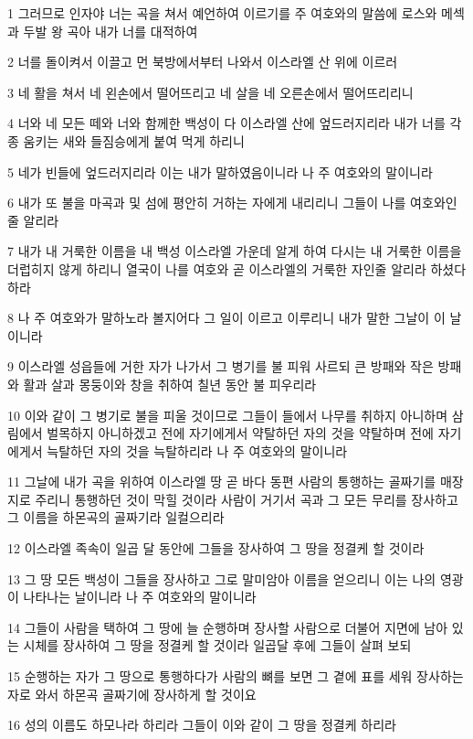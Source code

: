 \par 1 그러므로 인자야 너는 곡을 쳐서 예언하여 이르기를 주 여호와의 말씀에 로스와 메섹과 두발 왕 곡아 내가 너를 대적하여
\par 2 너를 돌이켜서 이끌고 먼 북방에서부터 나와서 이스라엘 산 위에 이르러
\par 3 네 활을 쳐서 네 왼손에서 떨어뜨리고 네 살을 네 오른손에서 떨어뜨리리니
\par 4 너와 네 모든 떼와 너와 함께한 백성이 다 이스라엘 산에 엎드러지리라 내가 너를 각종 움키는 새와 들짐승에게 붙여 먹게 하리니
\par 5 네가 빈들에 엎드러지리라 이는 내가 말하였음이니라 나 주 여호와의 말이니라
\par 6 내가 또 불을 마곡과 및 섬에 평안히 거하는 자에게 내리리니 그들이 나를 여호와인줄 알리라
\par 7 내가 내 거룩한 이름을 내 백성 이스라엘 가운데 알게 하여 다시는 내 거룩한 이름을 더럽히지 않게 하리니 열국이 나를 여호와 곧 이스라엘의 거룩한 자인줄 알리라 하셨다 하라
\par 8 나 주 여호와가 말하노라 볼지어다 그 일이 이르고 이루리니 내가 말한 그날이 이 날이니라
\par 9 이스라엘 성읍들에 거한 자가 나가서 그 병기를 불 피워 사르되 큰 방패와 작은 방패와 활과 살과 몽둥이와 창을 취하여 칠년 동안 불 피우리라
\par 10 이와 같이 그 병기로 불을 피울 것이므로 그들이 들에서 나무를 취하지 아니하며 삼림에서 벌목하지 아니하겠고 전에 자기에게서 약탈하던 자의 것을 약탈하며 전에 자기에게서 늑탈하던 자의 것을 늑탈하리라 나 주 여호와의 말이니라
\par 11 그날에 내가 곡을 위하여 이스라엘 땅 곧 바다 동편 사람의 통행하는 골짜기를 매장지로 주리니 통행하던 것이 막힐 것이라 사람이 거기서 곡과 그 모든 무리를 장사하고 그 이름을 하몬곡의 골짜기라 일컬으리라
\par 12 이스라엘 족속이 일곱 달 동안에 그들을 장사하여 그 땅을 정결케 할 것이라
\par 13 그 땅 모든 백성이 그들을 장사하고 그로 말미암아 이름을 얻으리니 이는 나의 영광이 나타나는 날이니라 나 주 여호와의 말이니라
\par 14 그들이 사람을 택하여 그 땅에 늘 순행하며 장사할 사람으로 더불어 지면에 남아 있는 시체를 장사하여 그 땅을 정결케 할 것이라 일곱달 후에 그들이 살펴 보되
\par 15 순행하는 자가 그 땅으로 통행하다가 사람의 뼈를 보면 그 곁에 표를 세워 장사하는 자로 와서 하몬곡 골짜기에 장사하게 할 것이요
\par 16 성의 이름도 하모나라 하리라 그들이 이와 같이 그 땅을 정결케 하리라
